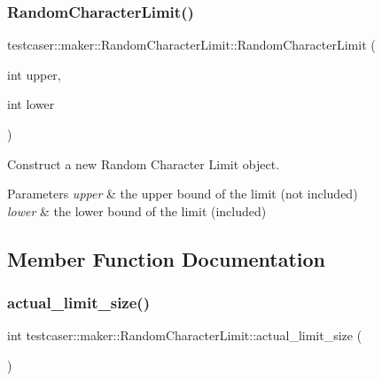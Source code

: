 \subsubsection{\texorpdfstring{Random\+Character\+Limit()}{RandomCharacterLimit()}\hspace{0.1cm}{\footnotesize\ttfamily [2/2]}}
{\footnotesize\ttfamily testcaser\+::maker\+::\+Random\+Character\+Limit\+::\+Random\+Character\+Limit (\begin{DoxyParamCaption}\item[{int}]{upper,  }\item[{int}]{lower }\end{DoxyParamCaption})\hspace{0.3cm}{\ttfamily [inline]}}



Construct a new Random Character Limit object. 


\begin{DoxyParams}{Parameters}
{\em upper} & the upper bound of the limit (not included) \\
\hline
{\em lower} & the lower bound of the limit (included) \\
\hline
\end{DoxyParams}


\subsection{Member Function Documentation}
\mbox{\label{classtestcaser_1_1maker_1_1RandomCharacterLimit_a912c757f9c26f6ba3e3ec18db3c904c5}} 
\subsubsection{\texorpdfstring{actual\+\_\+limit\+\_\+size()}{actual\_limit\_size()}}
{\footnotesize\ttfamily int testcaser\+::maker\+::\+Random\+Character\+Limit\+::actual\+\_\+limit\+\_\+size (\begin{DoxyParamCaption}{ }\end{DoxyParamCaption})\hspace{0.3cm}{\ttfamily [inline]}}



